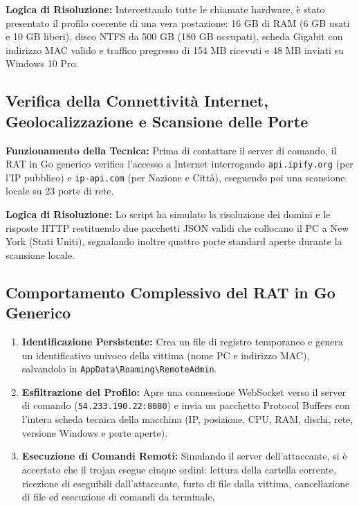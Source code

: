 \documentclass[11pt, a4paper]{article}
\begin{document}
	\textbf{Logica di Risoluzione:} Intercettando tutte le chiamate hardware, è stato presentato il profilo coerente di una vera postazione: 16 GB di RAM (6 GB usati e 10 GB liberi), disco NTFS da 500 GB (180 GB occupati), scheda Gigabit con indirizzo MAC valido e traffico pregresso di 154 MB ricevuti e 48 MB inviati su Windows 10 Pro.
	
	\subsection{Verifica della Connettività Internet, Geolocalizzazione e Scansione delle Porte}
	
	\textbf{Funzionamento della Tecnica:} Prima di contattare il server di comando, il RAT in Go generico verifica l'accesso a Internet interrogando \texttt{api.ipify.org} (per l'IP pubblico) e \texttt{ip-api.com} (per Nazione e Città), eseguendo poi una scansione locale su 23 porte di rete.
	
	\textbf{Logica di Risoluzione:} Lo script ha simulato la risoluzione dei domini e le risposte HTTP restituendo due pacchetti JSON validi che collocano il PC a New York (Stati Uniti), segnalando inoltre quattro porte standard aperte durante la scansione locale.
	
	\subsection{Comportamento Complessivo del RAT in Go Generico}
	
	\begin{enumerate}
		\item \textbf{Identificazione Persistente:} Crea un file di registro temporaneo e genera un identificativo univoco della vittima (nome PC e indirizzo MAC), salvandolo in \texttt{AppData\textbackslash Roaming\textbackslash RemoteAdmin}.
		\item \textbf{Esfiltrazione del Profilo:} Apre una connessione WebSocket verso il server di comando (\texttt{54.233.190.22:8080}) e invia un pacchetto Protocol Buffers con l'intera scheda tecnica della macchina (IP, posizione, CPU, RAM, dischi, rete, versione Windows e porte aperte).
		\item \textbf{Esecuzione di Comandi Remoti:} Simulando il server dell'attaccante, si è accertato che il trojan esegue cinque ordini: lettura della cartella corrente, ricezione di eseguibili dall'attaccante, furto di file dalla vittima, cancellazione di file ed esecuzione di comandi da terminale.
	\end{enumerate}
	
\end{document}
